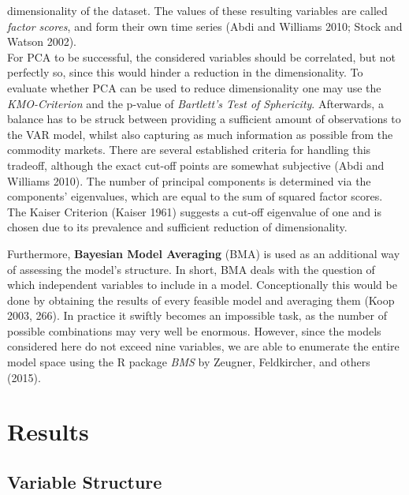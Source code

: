 \documentclass[12pt,]{article}
\begin{document}
dimensionality of the dataset. The values of these resulting variables
are called \emph{factor scores}, and form their own time series (Abdi
and Williams 2010; Stock and Watson 2002).\\
For PCA to be successful, the considered variables should be correlated,
but not perfectly so, since this would hinder a reduction in the
dimensionality. To evaluate whether PCA can be used to reduce
dimensionality one may use the \emph{KMO-Criterion} and the p-value of
\emph{Bartlett's Test of Sphericity}. Afterwards, a balance has to be
struck between providing a sufficient amount of observations to the VAR
model, whilst also capturing as much information as possible from the
commodity markets. There are several established criteria for handling
this tradeoff, although the exact cut-off points are somewhat subjective
(Abdi and Williams 2010). The number of principal components is
determined via the components' eigenvalues, which are equal to the sum
of squared factor scores. The Kaiser Criterion (Kaiser 1961) suggests a
cut-off eigenvalue of one and is chosen due to its prevalence and
sufficient reduction of dimensionality.

Furthermore, \textbf{Bayesian Model Averaging} (BMA) is used as an
additional way of assessing the model's structure. In short, BMA deals
with the question of which independent variables to include in a model.
Conceptionally this would be done by obtaining the results of every
feasible model and averaging them (Koop 2003, 266). In practice it
swiftly becomes an impossible task, as the number of possible
combinations may very well be enormous. However, since the models
considered here do not exceed nine variables, we are able to enumerate
the entire model space using the R package \emph{BMS} by Zeugner,
Feldkircher, and others (2015).

\section{Results}\label{results}

\subsection{Variable Structure}\label{variable-structure}
\end{document}
